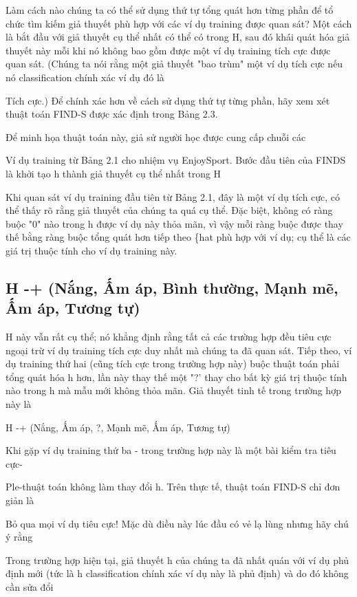Làm cách nào chúng ta có thể sử dụng thứ tự tổng quát hơn từng phần để tổ chức tìm kiếm giả thuyết phù hợp với các ví dụ training được quan sát? Một cách là bắt đầu với giả thuyết cụ thể nhất có thể có trong H, sau đó khái quát hóa giả thuyết này mỗi khi nó không bao gồm được một ví dụ training tích cực được quan sát. (Chúng ta nói rằng một giả thuyết "bao trùm" một ví dụ tích cực nếu nó classification chính xác ví dụ đó là

Tích cực.) Để chính xác hơn về cách sử dụng thứ tự từng phần, hãy xem xét thuật toán FIND-S được xác định trong Bảng 2.3.

Để minh họa thuật toán này, giả sử người học được cung cấp chuỗi các

Ví dụ training từ Bảng 2.1 cho nhiệm vụ EnjoySport. Bước đầu tiên của FINDS là khởi tạo h thành giả thuyết cụ thể nhất trong H

Khi quan sát ví dụ training đầu tiên từ Bảng 2.1, đây là một ví dụ tích cực, có thể thấy rõ rằng giả thuyết của chúng ta quá cụ thể. Đặc biệt, không có ràng buộc "0" nào trong h được ví dụ này thỏa mãn, vì vậy mỗi ràng buộc được thay thế bằng ràng buộc tổng quát hơn tiếp theo \{hat phù hợp với ví dụ; cụ thể là các giá trị thuộc tính cho ví dụ training này.

\subsection{H -+ (Nắng, Ấm áp, Bình thường, Mạnh mẽ, Ấm áp, Tương tự)}

H này vẫn rất cụ thể; nó khẳng định rằng tất cả các trường hợp đều tiêu cực ngoại trừ ví dụ training tích cực duy nhất mà chúng ta đã quan sát. Tiếp theo, ví dụ training thứ hai (cũng tích cực trong trường hợp này) buộc thuật toán phải tổng quát hóa h hơn, lần này thay thế một "?' thay cho bất kỳ giá trị thuộc tính nào trong h mà mẫu mới không thỏa mãn. Giả thuyết tinh tế trong trường hợp này là

H -+ (Nắng, Ấm áp, ?, Mạnh mẽ, Ấm áp, Tương tự)

Khi gặp ví dụ training thứ ba - trong trường hợp này là một bài kiểm tra tiêu cực-

Ple-thuật toán không làm thay đổi h. Trên thực tế, thuật toán FIND-S chỉ đơn giản là

Bỏ qua mọi ví dụ tiêu cực! Mặc dù điều này lúc đầu có vẻ lạ lùng nhưng hãy chú ý rằng

Trong trường hợp hiện tại, giả thuyết h của chúng ta đã nhất quán với ví dụ phủ định mới (tức là h classification chính xác ví dụ này là phủ định) và do đó không cần sửa đổi

